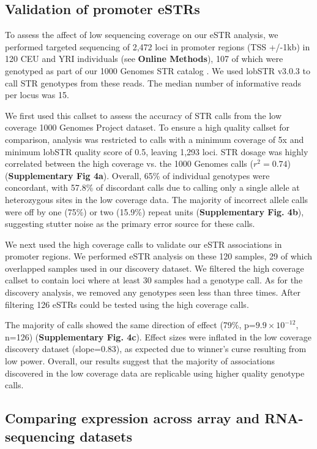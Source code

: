 \subsection{Validation of promoter eSTRs}

To assess the affect of low sequencing coverage on our eSTR analysis, we performed targeted sequencing of 2,472 loci in promoter regions (TSS +/-1kb) in 120 CEU and YRI individuals (see \textbf{Online Methods}), 107 of which were genotyped as part of our 1000 Genomes STR catalog \cite{WillemsGymrekHighnamEtAl2014}. We used lobSTR v3.0.3 to call STR genotypes from these reads. The median number of informative reads per locus was 15. 

We first used this callset to assess the accuracy of STR calls from the low coverage 1000 Genomes Project dataset. To ensure a high quality callset for comparison, analysis was restricted to calls with a minimum coverage of 5x and minimum lobSTR quality score of 0.5, leaving 1,293 loci. STR dosage was highly correlated between the high coverage vs. the 1000 Genomes calls ($r^2=0.74$) (\textbf{Supplementary Fig 4a}). Overall, 65\% of individual genotypes were concordant, with 57.8\% of discordant calls due to calling only a single allele at heterozygous sites in the low coverage data. The majority of incorrect allele calls were off by one (75\%) or two (15.9\%) repeat units (\textbf{Supplementary Fig. 4b}), suggesting stutter noise as the primary error source for these calls.

We next used the high coverage calls to validate our eSTR associations in promoter regions. We performed eSTR analysis on these 120 samples, 29 of which overlapped samples used in our discovery dataset. We filtered the high coverage callset to contain loci where at least 30 samples had a genotype call. As for the discovery analysis, we removed any genotypes seen less than three times. After filtering 126 eSTRs could be tested using the high coverage calls.

The majority of calls showed the same direction of effect (79\%, p=$9.9 \times 10^{-12}$, n=126) (\textbf{Supplementary Fig. 4c}). Effect sizes were inflated in the low coverage discovery dataset (slope=0.83), as expected due to winner's curse resulting from low power. Overall, our results suggest that the majority of associations discovered in the low coverage data are replicable using higher quality genotype calls.

\subsection{Comparing expression across array and RNA-sequencing datasets}

